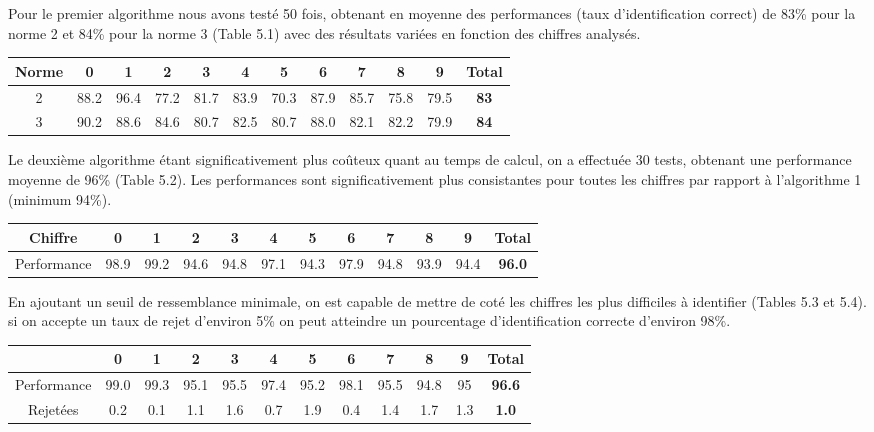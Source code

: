 \documentclass[a4paper,11pt,twoside]{report}
\begin{document}
Pour le premier algorithme nous avons testé 50 fois, obtenant en moyenne des performances (taux d'identification correct) de 83\% pour la norme 2 et 84\% pour la norme 3 (Table 5.1) avec des résultats variées en fonction des chiffres analysés.

\begin{center}
\begin{tabular}{ |c||c|c|c|c|c|c|c|c|c|c|c| } 
\hline
 Norme & 0 & 1 & 2 & 3 & 4 & 5 & 6 & 7 & 8 & 9 & \textbf{Total} \\ 
  \hline
  \hline
  2 & 88.2 & 96.4 & 77.2 & 81.7 & 83.9 & 70.3 & 87.9 & 85.7 & 75.8 & 79.5 & \textbf{83} \\
 \hline
  3 & 90.2 & 88.6 & 84.6 & 80.7 & 82.5 & 80.7 & 88.0 & 82.1 & 82.2 & 79.9 & \textbf{84} \\
 \hline
\end{tabular}
\end{center}

Le deuxième algorithme étant significativement plus coûteux quant au temps de calcul, on a effectuée 30 tests, obtenant une performance moyenne de 96\% (Table 5.2). Les performances sont significativement plus consistantes pour toutes les chiffres par rapport à l'algorithme 1 (minimum 94\%).

\begin{center}
\begin{tabular}{ |c||c|c|c|c|c|c|c|c|c|c|c| } 
\hline
 Chiffre & 0 & 1 & 2 & 3 & 4 & 5 & 6 & 7 & 8 & 9 & \textbf{Total} \\ 
  \hline
  \hline
  Performance & 98.9 & 99.2 & 94.6 & 94.8 & 97.1 & 94.3 & 97.9 & 94.8 & 93.9 & 94.4 & \textbf{96.0} \\ 
\hline
\end{tabular}
\end{center}

En ajoutant un seuil de ressemblance minimale, on est capable de mettre de coté les chiffres les plus difficiles à identifier (Tables 5.3 et 5.4). si on accepte un taux de rejet d'environ 5\% on peut atteindre un pourcentage d'identification correcte d'environ 98\%.

\begin{center}
\begin{tabular}{ |c||c|c|c|c|c|c|c|c|c|c|c| } 
 \hline
   & 0 & 1 & 2 & 3 & 4 & 5 & 6 & 7 & 8 & 9 & \textbf{Total} \\ 
  \hline
  \hline
 Performance & 99.0 & 99.3 & 95.1 & 95.5 & 97.4 & 95.2 & 98.1 & 95.5 & 94.8 & 95 &  \textbf{96.6} \\
  \hline
 Rejetées & 0.2 & 0.1 & 1.1 & 1.6 & 0.7 & 1.9 & 0.4 & 1.4 & 1.7 & 1.3 & \textbf{1.0} \\
 \hline
\end{tabular}
\end{center}
\end{document}
